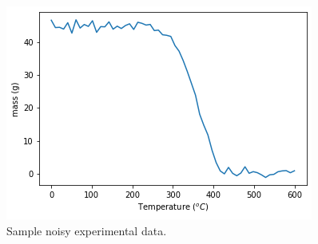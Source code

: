 \begin{figure}[h!]
\includegraphics[scale=1]{figures/bayesian/Noisy_tga.png}
\caption{Sample noisy experimental data.}
\label{fig:single_mass}
\end{figure}

